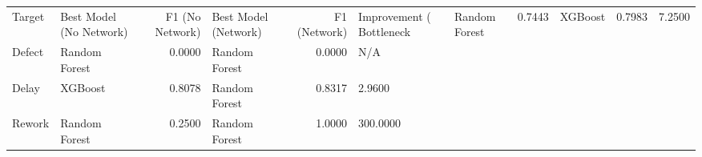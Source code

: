 \begin{tabular}{llrlrl}
\toprule
Target & Best Model (No Network) & F1 (No Network) & Best Model (Network) & F1 (Network) & Improvement (%
\midrule
Bottleneck & Random Forest & 0.7443 & XGBoost & 0.7983 & 7.2500 \\
Defect & Random Forest & 0.0000 & Random Forest & 0.0000 & N/A \\
Delay & XGBoost & 0.8078 & Random Forest & 0.8317 & 2.9600 \\
Rework & Random Forest & 0.2500 & Random Forest & 1.0000 & 300.0000 \\
\bottomrule
\end{tabular}
